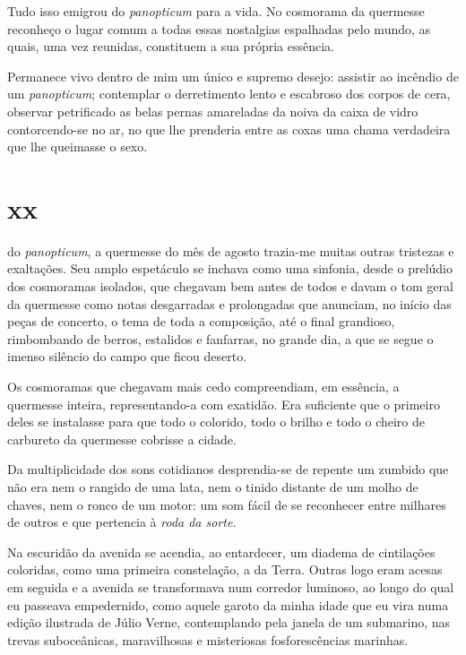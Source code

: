 Tudo isso emigrou do \textit{panopticum} para a vida. No cosmorama da
quermesse reconheço o lugar comum a todas essas nostalgias espalhadas pelo
mundo, as quais, uma vez reunidas, constituem a sua própria essência.

Permanece vivo dentro de mim um único e supremo desejo: assistir ao incêndio
de um \textit{panopticum}; contemplar o derretimento lento e escabroso dos
corpos de cera, observar petrificado as belas pernas amareladas da noiva da
caixa de vidro contorcendo-se no ar, no que lhe prenderia entre as coxas uma
chama verdadeira que lhe queimasse o sexo.


\section{xx} 

 do \textit{panopticum}, a quermesse do mês de agosto trazia-me
 muitas outras tristezas e exaltações. Seu amplo espetáculo se inchava como
 uma sinfonia, desde o prelúdio dos cosmoramas isolados, que chegavam bem
 antes de todos e davam o tom geral da quermesse como notas desgarradas e
 prolongadas que anunciam, no início das peças de concerto, o tema de toda a
 composição, até o final grandioso, rimbombando de berros, estalidos e
 fanfarras, no grande dia, a que se segue o imenso silêncio do campo que
 ficou deserto.

Os cosmoramas que chegavam mais cedo compreendiam, em essência, a quermesse
inteira, representando-a com exatidão. Era suficiente que o primeiro deles se
instalasse para que todo o colorido, todo o brilho e todo o cheiro de
carbureto da quermesse cobrisse a cidade.

Da multiplicidade dos sons cotidianos desprendia-se de repente um zumbido que
não era nem o rangido de uma lata, nem o tinido distante de um molho de
chaves, nem o ronco de um motor: um som fácil de se reconhecer entre milhares
de outros e que pertencia à \textit{roda da sorte}.

Na escuridão da avenida se acendia, ao entardecer, um diadema de cintilações
coloridas, como uma primeira constelação, a da Terra. Outras logo eram acesas
em seguida e a avenida se transformava num corredor luminoso, ao longo do
qual eu passeava empedernido, como aquele garoto da minha idade que eu vira
numa edição ilustrada de Júlio Verne, contemplando pela janela de um
submarino, nas trevas suboceânicas, maravilhosas e misteriosas
fosforescências marinhas.


